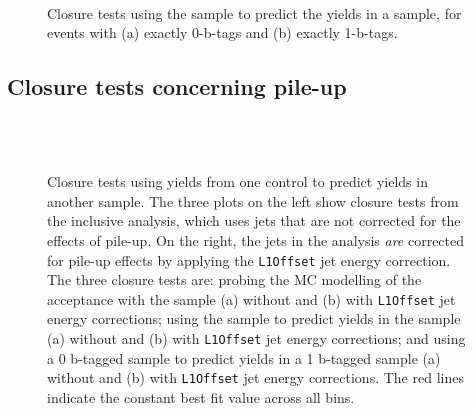 \newpage
\begin{figure}[!h]
  \begin{center}
     \\
    \caption{Closure tests using the \mj sample to predict the yields in
      a \mmj sample, for events with (a) exactly 0-b-tags and (b)
      exactly 1-b-tags.}
    \label{fig:btag-samples}
  \end{center}
\end{figure}

\newpage
\subsection{Closure tests concerning pile-up\label{closure-pileup}}

\begin{figure}[!h]
  \begin{center}
     \\
     \\
    \caption{Closure tests using yields from one control to predict
      yields in another sample. The three plots on the left show
      closure tests from the inclusive analysis, which uses jets that
      are not corrected for the effects of pile-up. On the right, the
      jets in the analysis {\it are} corrected for pile-up effects by
      applying the \texttt{L1Offset} jet energy correction. The three
      closure tests are: probing the MC modelling of the \alt
      acceptance with the \mj sample (a) without and (b) with
      \texttt{L1Offset} jet energy corrections; using the \mj sample
      to predict yields in the \mmj sample (a) without and (b) with
      \texttt{L1Offset} jet energy corrections; and using a 0 b-tagged
      \mj sample to predict yields in a 1 b-tagged \mj sample (a)
      without and (b) with \texttt{L1Offset} jet energy
      corrections. The red lines indicate the constant best fit value
      across all \HT bins.}
    \label{fig:closure-pileup}
  \end{center}
\end{figure}


